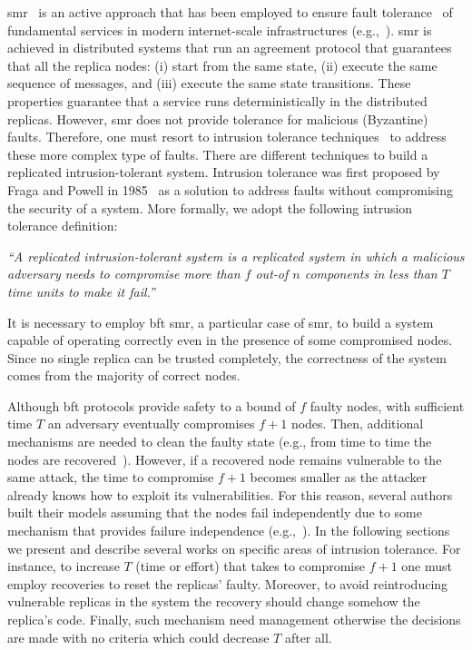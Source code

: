 \gls{smr}~\cite{Lamport:1984} is an active approach that has been employed to ensure fault tolerance~\cite{Schneider:1990} of fundamental services in modern internet-scale infrastructures (e.g.,~\cite{Hunt:2010,Calder:2011,Corbett:2013}).
\gls{smr} is achieved in distributed systems that run an agreement protocol that guarantees that all the replica nodes: (i) start from the same state, (ii) execute the same sequence of messages, and (iii) execute the same state transitions. 
These properties guarantee that a service runs deterministically in the distributed replicas.
However, \gls{smr} does not provide tolerance for malicious (Byzantine) faults.
Therefore, one must resort to intrusion tolerance techniques~\cite{Verissimo:2003} to address these more complex type of faults.
There are different techniques to build a replicated intrusion-tolerant system.
Intrusion tolerance was first proposed by Fraga and Powell in 1985~\cite{Fraga:1985} as a solution to address faults without compromising the security of a system. 
More formally, we adopt the following intrusion tolerance definition: 

\begin{defn}
\emph{``A replicated intrusion-tolerant system is a replicated system in which a malicious adversary needs to compromise more than $f$ out-of $n$ components in less than $T$ time units to make it fail.''}~\cite{Bessani:2011}
\label{def:def2}
\end{defn}

It is necessary to employ \gls{bft} \gls{smr}, a particular case of \gls{smr}, to build a system capable of operating correctly even in the presence of some compromised nodes.
Since no single replica can be trusted completely, the correctness of the system comes from the majority of correct nodes. 


Although \gls{bft} protocols provide safety to a bound of $f$ faulty nodes, with sufficient time $T$ an adversary eventually compromises $f+1$ nodes.
Then, additional mechanisms are needed to clean the faulty state (e.g., from time to time the nodes are recovered~\cite{Castro:2002}).
However, if a recovered node remains vulnerable to the same attack, the time to compromise $f+1$ becomes smaller as the attacker already knows how to exploit its vulnerabilities.
For this reason, several authors built their models assuming that the nodes fail independently due to some mechanism that provides failure independence (e.g.,~\cite{Castro:2002,Veronese:2013,Sousa:2010}).
In the following sections we present and describe several works on specific areas of intrusion tolerance.
For instance, to increase $T$ (time or effort) that takes to compromise $f+1$ one must employ recoveries to reset the replicas' faulty. 
Moreover, to avoid reintroducing vulnerable replicas in the system the recovery should change somehow the replica's code.
Finally, such mechanism need management otherwise the decisions are made with no criteria which could decrease $T$ after all.


